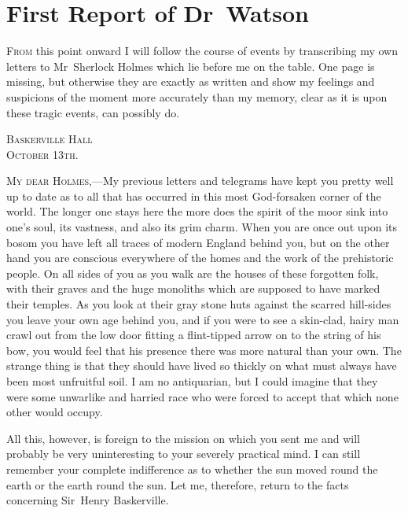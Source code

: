 

\chapter{First Report of Dr~Watson}
\lettrine{F}{rom} this point onward I will follow the course of events by transcribing my own letters to Mr~Sherlock Holmes which lie before me on the table. One page is missing, but otherwise they are exactly as written and show my feelings and suspicions of the moment more accurately than my memory, clear as it is upon these tragic events, can possibly do.\\

\begin{flushright}
\hfill\begin{minipage}{0.3\linewidth}\textsc{Baskerville Hall\\October 13th.}\end{minipage}
\end{flushright}


\textsc{My dear Holmes},—My previous letters and telegrams have kept you pretty well up to date as to all that has occurred in this most God-forsaken corner of the world. The longer one stays here the more does the spirit of the moor sink into one's soul, its vastness, and also its grim charm. When you are once out upon its bosom you have left all traces of modern England behind you, but on the other hand you are conscious everywhere of the homes and the work of the prehistoric people. On all sides of you as you walk are the houses of these forgotten folk, with their graves and the huge monoliths which are supposed to have marked their temples. As you look at their gray stone huts against the scarred hill-sides you leave your own age behind you, and if you were to see a skin-clad, hairy man crawl out from the low door fitting a flint-tipped arrow on to the string of his bow, you would feel that his presence there was more natural than your own. The strange thing is that they should have lived so thickly on what must always have been most unfruitful soil. I am no antiquarian, but I could imagine that they were some unwarlike and harried race who were forced to accept that which none other would occupy.

All this, however, is foreign to the mission on which you sent me and will probably be very uninteresting to your severely practical mind. I can still remember your complete indifference as to whether the sun moved round the earth or the earth round the sun. Let me, therefore, return to the facts concerning Sir~Henry Baskerville.

